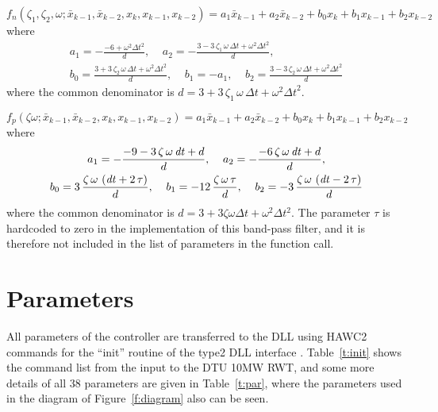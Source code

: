 \begin{equation}
\label{e:fn}
f_n \left(\zeta_{1}, \zeta_{2}, \omega; \bar x_{k-1} , \bar x_{k-2} , x_{k} , x_{k-1} , x_{k-2} \right) = a_1 \bar x_{k-1} + a_2 \bar x_{k-2} + b_0 x_k + b_1 x_{k-1}+ b_2 x_{k-2}
\end{equation}
where
\begin{gather}\nonumber
a_1=-{\frac {-6+{\omega}^{2}{\Delta t}^{2}}{d}},
\;\;\;\;
a_2=-{\frac {3-3\,\zeta_{1}\,\omega\,\Delta t+{\omega}^{2}{\Delta t}^{2}}{d}}, \\
\label{e:fncoef}
b_0 = {\frac {3+3\,\zeta_{2}\,\omega\,\Delta t+{\omega}^{2}{\Delta t}^{2}}{d}}, \;\;\;\; 
b_1 = -a_1,\;\;\;\; 
b_2 = {\frac {3-3\,\zeta_{2}\,\omega\,\Delta t+{\omega}^{2}{\Delta t}^{2}}{d}}
\end{gather}
where the common denominator is $d=3+3\,\zeta_{1}\,\omega\,\Delta t+{\omega}^{2}{\Delta t}^{2}$.


\begin{equation}
\label{e:fp}
f_p \left(\zeta \omega; \bar x_{k-1} , \bar x_{k-2} , x_{k} , x_{k-1} , x_{k-2} \right) = a_1 \bar x_{k-1} + a_2 \bar x_{k-2} + b_0 x_k + b_1 x_{k-1}+ b_2 x_{k-2}
\end{equation}
where
\begin{gather}\nonumber
a_1 = -{\frac {-9-3\,\zeta\,\omega\,{\it dt}+d}{d}},\;\;\;\;
a_2 =-{\frac {-6\,\zeta\,\omega\,{\it dt}+d}{d}}, \\
\label{e:fpcoef}
b_0 =3\,{\frac {\zeta\,\omega\, \left( {\it dt}+2\,\tau \right) }{d}} ,\;\;\;\; 
b_1 =-12\,{\frac {\zeta\,\omega\,\tau}{d}} ,\;\;\;\; 
b_2 =-3\,{\frac {\zeta\,\omega\, \left( {\it dt}-2\,\tau \right) }{d}} 
\end{gather}
where the common denominator is $d=3+3 \zeta \omega \Delta t+\omega^2 \Delta t^2$. The parameter $\tau$ is hardcoded to zero in the implementation of this band-pass filter, and it is therefore not included in the list of parameters in the function call.



\section{Parameters}

All parameters of the controller are transferred to the DLL using HAWC2 commands for the ``init'' routine of the type2 DLL interface \cite{Larsen12}. Table~\ref{t:init} shows the command list from the input to the DTU 10MW RWT, and some more details of all 38 parameters are given in Table~\ref{t:par}, where the parameters used in the diagram of Figure~\ref{f:diagram} also can be seen.

